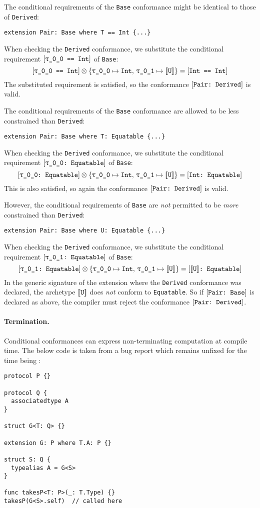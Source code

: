 \documentclass[../generics]{subfiles}
\begin{document}
 The conditional requirements of the \texttt{Base} conformance might be identical to those of \texttt{Derived}:
\begin{Verbatim}
extension Pair: Base where T == Int {...}
\end{Verbatim}
When checking the \texttt{Derived} conformance, we substitute the conditional requirement $\SameReq{\rT}{Int}$ of \texttt{Base}:
\[\SameReq{\rT}{Int}\otimes \SubstMap{\SubstType{\rT}{Int},\,\SubstType{\rU}{$\archetype{U}$}}=\SameReq{Int}{Int}\]
The substituted requirement is satisfied, so the conformance $[\texttt{Pair:~Derived}]$ is valid.

 The conditional requirements of the \texttt{Base} conformance are allowed to be less  constrained than \texttt{Derived}:
\begin{Verbatim}
extension Pair: Base where T: Equatable {...}
\end{Verbatim}
When checking the \texttt{Derived} conformance, we substitute the conditional requirement $\ConfReq{\rT}{Equatable}$ of \texttt{Base}:
\[\ConfReq{\rT}{Equatable}\otimes\SubstMap{\SubstType{\rT}{Int},\,\SubstType{\rU}{$\archetype{U}$}}=\ConfReq{Int}{Equatable}\]
This is also satisfied, so again the conformance $[\texttt{Pair:~Derived}]$ is valid.

 However, the conditional requirements of \texttt{Base} are \emph{not} permitted to be \emph{more} constrained than \texttt{Derived}:
\begin{Verbatim}
extension Pair: Base where U: Equatable {...}
\end{Verbatim}
When checking the \texttt{Derived} conformance, we substitute the conditional requirement $\ConfReq{\rU}{Equatable}$ of \texttt{Base}:
\[\ConfReq{\rU}{Equatable}\otimes \SubstMap{\SubstType{\rT}{Int},\,\SubstType{\rU}{$\archetype{U}$}}=\ConfReq{$\archetype{U}$}{Equatable}\]
In the generic signature of the extension where the \texttt{Derived} conformance was declared, the archetype $[\![\texttt{U}]\!]$ does \emph{not} conform to \texttt{Equatable}. So if $[\texttt{Pair:~Base}]$ is declared as above, the compiler must reject the conformance $[\texttt{Pair:~Derived}]$.

\paragraph{Termination.}
Conditional conformances can express non-terminating computation at compile time. 
The below code is taken from a bug report which remains unfixed for the time being \cite{sr6724}:
\begin{Verbatim}
protocol P {}

protocol Q {
  associatedtype A
}

struct G<T: Q> {}

extension G: P where T.A: P {}

struct S: Q {
  typealias A = G<S>
}

func takesP<T: P>(_: T.Type) {}
takesP(G<S>.self)  // called here
\end{Verbatim}
\end{document}
